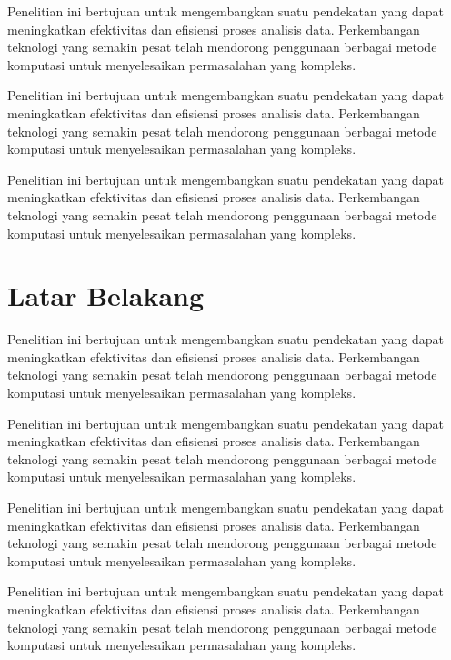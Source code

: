 Penelitian ini bertujuan untuk mengembangkan suatu pendekatan yang dapat meningkatkan efektivitas dan efisiensi proses analisis data. Perkembangan teknologi yang semakin pesat telah mendorong penggunaan berbagai metode komputasi untuk menyelesaikan permasalahan yang kompleks.

Penelitian ini bertujuan untuk mengembangkan suatu pendekatan yang dapat meningkatkan efektivitas dan efisiensi proses analisis data. Perkembangan teknologi yang semakin pesat telah mendorong penggunaan berbagai metode komputasi untuk menyelesaikan permasalahan yang kompleks.

Penelitian ini bertujuan untuk mengembangkan suatu pendekatan yang dapat meningkatkan efektivitas dan efisiensi proses analisis data. Perkembangan teknologi yang semakin pesat telah mendorong penggunaan berbagai metode komputasi untuk menyelesaikan permasalahan yang kompleks.

\section{Latar Belakang}

Penelitian ini bertujuan untuk mengembangkan suatu pendekatan yang dapat meningkatkan efektivitas dan efisiensi proses analisis data. Perkembangan teknologi yang semakin pesat telah mendorong penggunaan berbagai metode komputasi untuk menyelesaikan permasalahan yang kompleks.

Penelitian ini bertujuan untuk mengembangkan suatu pendekatan yang dapat meningkatkan efektivitas dan efisiensi proses analisis data. Perkembangan teknologi yang semakin pesat telah mendorong penggunaan berbagai metode komputasi untuk menyelesaikan permasalahan yang kompleks.

Penelitian ini bertujuan untuk mengembangkan suatu pendekatan yang dapat meningkatkan efektivitas dan efisiensi proses analisis data. Perkembangan teknologi yang semakin pesat telah mendorong penggunaan berbagai metode komputasi untuk menyelesaikan permasalahan yang kompleks.

Penelitian ini bertujuan untuk mengembangkan suatu pendekatan yang dapat meningkatkan efektivitas dan efisiensi proses analisis data. Perkembangan teknologi yang semakin pesat telah mendorong penggunaan berbagai metode komputasi untuk menyelesaikan permasalahan yang kompleks.
